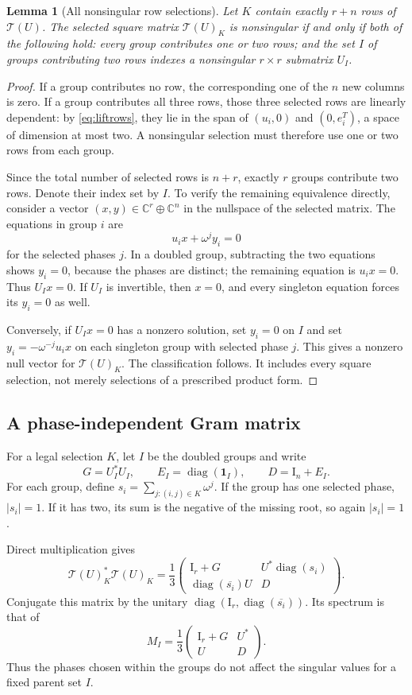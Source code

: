 \documentclass[11pt,letterpaper]{article}
\newtheorem{lemma}[theorem]{Lemma}
\theoremstyle{definition}
\theoremstyle{remark}
\newcommand{\C}{\mathbb C}
\newcommand{\Id}{\mathrm I}
\newcommand{\diag}{\operatorname{diag}}
\newcommand{\T}{\mathcal T}
\begin{document}
\begin{lemma}[All nonsingular row selections]\label{lem:bases}
Let $K$ contain exactly $r+n$ rows of $\T(U)$. The selected square matrix $\T(U)_K$ is nonsingular if and only if both of the following hold: every group contributes one or two rows; and the set $I$ of groups contributing two rows indexes a nonsingular $r\times r$ submatrix $U_I$.
\end{lemma}
\begin{proof}
If a group contributes no row, the corresponding one of the $n$ new columns is zero. If a group contributes all three rows, those three selected rows are linearly dependent: by \eqref{eq:liftrows}, they lie in the span of $(u_i,0)$ and $(0,e_i^T)$, a space of dimension at most two. A nonsingular selection must therefore use one or two rows from each group.

Since the total number of selected rows is $n+r$, exactly $r$ groups contribute two rows. Denote their index set by $I$. To verify the remaining equivalence directly, consider a vector $(x,y)\in\C^r\oplus\C^n$ in the nullspace of the selected matrix. The equations in group $i$ are
\[
 u_i x+\omega^j y_i=0
\]
for the selected phases $j$. In a doubled group, subtracting the two equations shows $y_i=0$, because the phases are distinct; the remaining equation is $u_i x=0$. Thus $U_Ix=0$. If $U_I$ is invertible, then $x=0$, and every singleton equation forces its $y_i=0$ as well.

Conversely, if $U_Ix=0$ has a nonzero solution, set $y_i=0$ on $I$ and set $y_i=-\omega^{-j}u_i x$ on each singleton group with selected phase $j$. This gives a nonzero null vector for $\T(U)_K$. The classification follows. It includes every square selection, not merely selections of a prescribed product form.
\end{proof}

\subsection{A phase-independent Gram matrix}

For a legal selection $K$, let $I$ be the doubled groups and write
\[
 G=U_I^*U_I,\qquad E_I=\diag(\mathbf1_I),\qquad D=\Id_n+E_I.
\]
For each group, define $s_i=\sum_{j:(i,j)\in K}\omega^j$. If the group has one selected phase, $|s_i|=1$. If it has two, its sum is the negative of the missing root, so again $|s_i|=1$.

Direct multiplication gives
\[
 \T(U)_K^*\T(U)_K
 =\frac13\begin{pmatrix}
  \Id_r+G & U^*\diag(s_i)\\
  \diag(\overline{s_i})U&D
 \end{pmatrix}.
\]
Conjugate this matrix by the unitary
$\diag(\Id_r,\diag(\overline{s_i}))$. Its spectrum is that of
\begin{equation}
 M_I=\frac13\begin{pmatrix}
  \Id_r+G&U^*\\ U&D
 \end{pmatrix}.
 \label{eq:canonical}
\end{equation}
Thus the phases chosen within the groups do not affect the singular values for a fixed parent set $I$.
\end{document}
